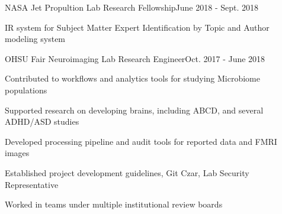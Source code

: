 \documentclass{article}
\newenvironment{**mylist}[2]{
  \subsubsection*{#1\hfill\small#2}
  \small
  \begin{list}{}{}
   \setlength{\topsep}{0pt}
   \setlength{\itemsep}{1pt}
   \setlength{\parskip}{0pt}
   \setlength{\parsep}{0pt}}{\end{list}\normalsize}
\newcommand{\LU}[1]{\hspace{-1em}{\bf Languages Used : #1}}
\begin{document}
\begin{comment}
\begin{**mylist}{Honors and Related Activities}{}
\item Comap Mathematical Modeling Competition (Meritorious Winner) - Top 10\%\hfill- Feb. 2012
\item Comap Mathematical Modeling Competition (Honorable Mention) { }- Top 30\%\hfill- Feb. 2011
\end{**mylist}
\end{comment}

\begin{**mylist}{NASA Jet Propultion Lab \tabb Research Fellowship}{June 2018 - Sept. 2018}
\item IR system for Subject Matter Expert Identification by Topic and Author modeling system
\end{**mylist}


\begin{**mylist}{OHSU Fair Neuroimaging Lab \tabb Research Engineer}{Oct. 2017 - June 2018}
\item Contributed to workflows and analytics tools for studying Microbiome populations
\item Supported research on developing brains, including ABCD, and several ADHD/ASD studies
\item Developed processing pipeline and audit tools for reported data and FMRI images
\item Established project development guidelines, Git Czar, Lab Security Representative
\item Worked in teams under multiple institutional review boards
\item \LU{Python, Bash, R, neo4j, ponyorm, stan}
\end{**mylist}
\end{document}
